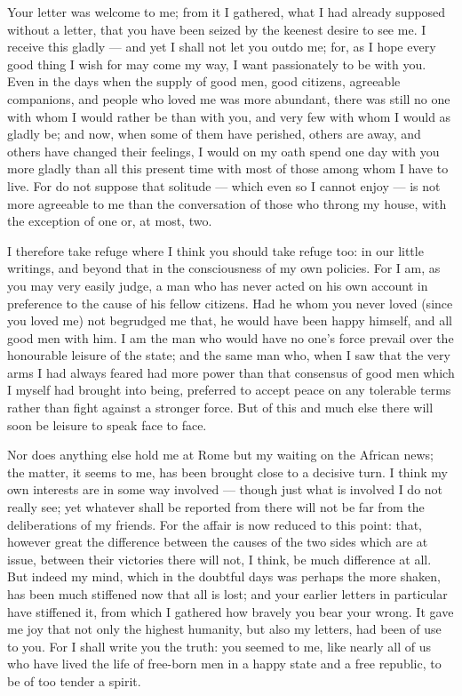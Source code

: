 

 Your letter was welcome to me; from it I gathered, what I had already supposed without a letter, that you have been seized by the keenest desire to see me. I receive this gladly --- and yet I shall not let you outdo me; for, as I hope every good thing I wish for may come my way, I want passionately to be with you. Even in the days when the supply of good men, good citizens, agreeable companions, and people who loved me was more abundant, there was still no one with whom I would rather be than with you, and very few with whom I would as gladly be; and now, when some of them have perished, others are away, and others have changed their feelings, I would on my oath spend one day with you more gladly than all this present time with most of those among whom I have to live. For do not suppose that solitude --- which even so I cannot enjoy --- is not more agreeable to me than the conversation of those who throng my house, with the exception of one or, at most, two.

 I therefore take refuge where I think you should take refuge too: in our little writings, and beyond that in the consciousness of my own policies. For I am, as you may very easily judge, a man who has never acted on his own account in preference to the cause of his fellow citizens. Had he whom you never loved (since you loved me) not begrudged me that, he would have been happy himself, and all good men with him. I am the man who would have no one's force prevail over the honourable leisure of the state; and the same man who, when I saw that the very arms I had always feared had more power than that consensus of good men which I myself had brought into being, preferred to accept peace on any tolerable terms rather than fight against a stronger force. But of this and much else there will soon be leisure to speak face to face.

 Nor does anything else hold me at Rome but my waiting on the African news; the matter, it seems to me, has been brought close to a decisive turn. I think my own interests are in some way involved --- though just what is involved I do not really see; yet whatever shall be reported from there will not be far from the deliberations of my friends. For the affair is now reduced to this point: that, however great the difference between the causes of the two sides which are at issue, between their victories there will not, I think, be much difference at all. But indeed my mind, which in the doubtful days was perhaps the more shaken, has been much stiffened now that all is lost; and your earlier letters in particular have stiffened it, from which I gathered how bravely you bear your wrong. It gave me joy that not only the highest humanity, but also my letters, had been of use to you. For I shall write you the truth: you seemed to me, like nearly all of us who have lived the life of free-born men in a happy state and a free republic, to be of too tender a spirit.

